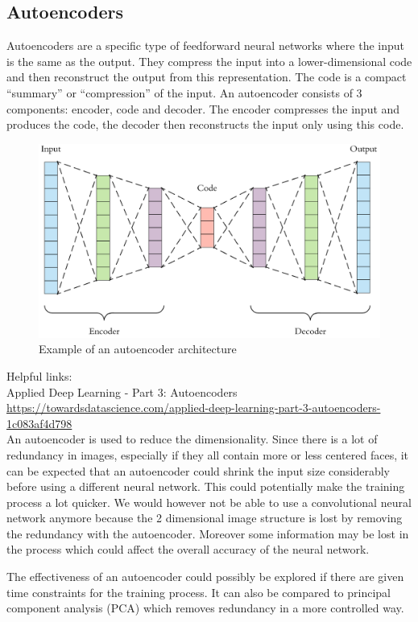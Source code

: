 \subsection{Autoencoders}

Autoencoders are a specific type of feedforward neural networks where the input is the same as the output. They compress the input into a lower-dimensional code and then reconstruct the output from this representation. The code is a compact “summary” or “compression” of the input.
An autoencoder consists of 3 components: encoder, code and decoder. The encoder compresses the input and produces the code, the decoder then reconstructs the input only using this code.

\begin{figure}[hbtp]
	\centering
	\includegraphics[width=1\textwidth]{Images/Autoencoder}
	\caption{Example of an autoencoder architecture}
\end{figure}

Helpful links:\\
Applied Deep Learning - Part 3: Autoencoders
\\
\url{https://towardsdatascience.com/applied-deep-learning-part-3-autoencoders-1c083af4d798}\\

An autoencoder is used to reduce the dimensionality. Since there is a lot of redundancy in images, especially if they all contain more or less centered faces, it can be expected that an autoencoder could shrink the input size considerably before using a different neural network. This could potentially make the training process a lot quicker. We would however not be able to use a convolutional neural network anymore because the 2 dimensional image structure is lost by removing the redundancy with the autoencoder. Moreover some information may be lost in the process which could affect the overall accuracy of the neural network. 

The effectiveness of an autoencoder could possibly be explored if there are given time constraints for the training process. It can also be compared to principal component analysis (PCA) which removes redundancy in a more controlled way. 





\newpage